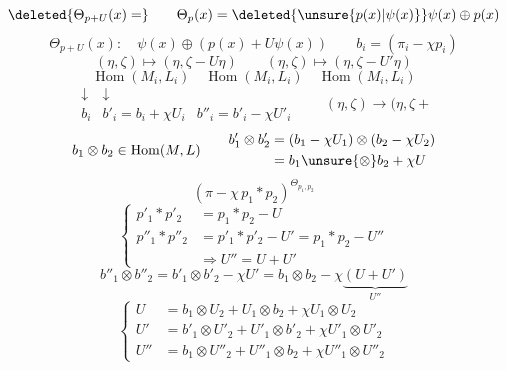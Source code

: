 \[
\deleted{\Theta_{p+U}(x)=}\qquad
\Theta_p(x)=\deleted{\unsure{p(x)|\psi(x)}}\psi(x)\oplus p(x)
\]
\[
\Theta_{p+U}(x):\quad\psi(x)\oplus(p(x)+U\psi(x))
\qquad\boxed{b_i=(\pi_i-\chi p_i)}
\]
\[
(\eta,\zeta)\longmapsto(\eta,\zeta-U\eta)
\qquad(\eta,\zeta)\longmapsto(\eta,\zeta-U'\eta)
\]
\[
\operatorname{Hom}(M_i,L_i)\quad
\operatorname{Hom}(M_i,L_i)\quad\operatorname{Hom}(M_i,L_i)
\]
\[
\begin{array}{ccc}
\downarrow&\downarrow&\\
b_i&b'_i=b_i+\chi U_i&b''_i=b'_i-\chi U'_i
\end{array}
\qquad(\eta,\zeta)\longrightarrow(\eta,\zeta+
\]
\[
b_1\otimes b_2\in\operatorname{Hom}(M,L)
\qquad
\begin{aligned}
b'_1\otimes b'_2&=(b_1-\chi U_1)\otimes(b_2-\chi U_2)\\
&=b_1\unsure{\otimes}b_2+\chi U
\end{aligned}
\]
\[
(\pi-\chi\,p_1*p_2)^{\Theta_{p_1,p_2}}
\]
\[
\left\{\begin{aligned}
p'_1*p'_2&=p_1*p_2-U\\
p''_1*p''_2&=p'_1*p'_2-U'=p_1*p_2-U''\\
&\Longrightarrow U''=U+U'
\end{aligned}\right.
\]
\[
b''_1\otimes b''_2=b'_1\otimes b'_2-\chi U'
=b_1\otimes b_2-\chi\underbrace{(U+U')}_{U''}
\]
\[
\left\{\begin{aligned}
U&=b_1\otimes U_2+U_1\otimes b_2+\chi U_1\otimes U_2\\
U'&=b'_1\otimes U'_2+U'_1\otimes b'_2+\chi U'_1\otimes U'_2\\
U''&=b_1\otimes U''_2+U''_1\otimes b_2+\chi U''_1\otimes U''_2
\end{aligned}\right.
\]
